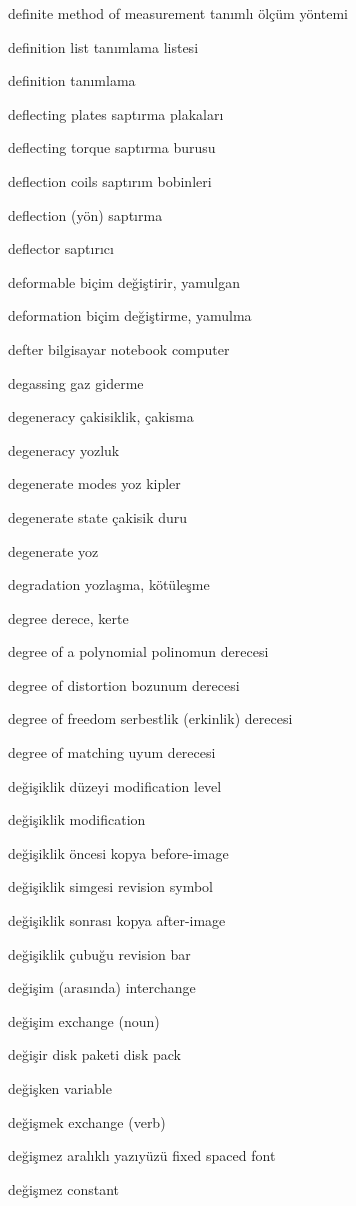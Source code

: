 \documentclass[12pt,fleqn]{article}\usepackage{../../common}
\begin{document}
definite method of measurement tanımlı ölçüm yöntemi

definition list tanımlama listesi

definition tanımlama

deflecting plates saptırma plakaları

deflecting torque saptırma burusu

deflection coils saptırım bobinleri

deflection (yön) saptırma

deflector saptırıcı

deformable biçim değiştirir, yamulgan

deformation biçim değiştirme, yamulma

defter bilgisayar notebook computer

degassing gaz giderme

degeneracy çakisiklik, çakisma

degeneracy yozluk

degenerate modes yoz kipler

degenerate state çakisik duru

degenerate yoz

degradation yozlaşma, kötüleşme

degree derece, kerte

degree of a polynomial polinomun derecesi

degree of distortion bozunum derecesi

degree of freedom serbestlik (erkinlik) derecesi

degree of matching uyum derecesi

değişiklik düzeyi modification level

değişiklik modification

değişiklik öncesi kopya before-image

değişiklik simgesi revision symbol

değişiklik sonrası kopya after-image

değişiklik çubuğu revision bar

değişim (arasında) interchange

değişim exchange (noun)

değişir disk paketi disk pack

değişken variable

değişmek exchange (verb)

değişmez aralıklı yazıyüzü fixed spaced font

değişmez constant
\end{document}
